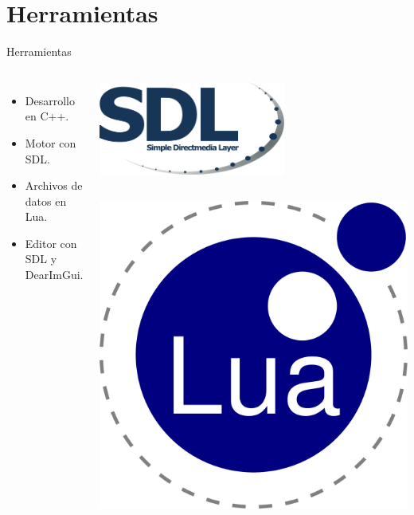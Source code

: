 \documentclass[aspectratio=169]{beamer}
\begin{document}
\section{Herramientas}
\begin{frame}{Herramientas}
	\begin{columns}
		\begin{itemize}
			\item Desarrollo en C++.
			\item Motor con SDL.
			\item Archivos de datos en Lua.
			\item Editor con SDL y DearImGui.
		\end{itemize}
		\begin{center}
			\includegraphics[width=0.6\textwidth]{imgs/herramientas/sdl.pdf}
			\begin{columns}
				\includegraphics[width=\textwidth]{imgs/herramientas/lua.pdf}

\end{columns}
\end{center}
\end{columns}
\end{frame}
\end{document}
